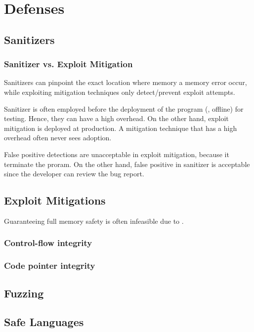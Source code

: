 \documentclass[11pt]{memoir}
\begin{document}
\chapter{Defenses}



\section{Sanitizers}
\subsection{Sanitizer vs. Exploit Mitigation}
Sanitizers can pinpoint the exact location where memory a memory error occur, while exploiting mitigation techniques only detect/prevent exploit attempts.

Sanitizer is often employed before the deployment of the program (\ie, offline) for testing.
Hence, they can have a high overhead.
On the other hand, exploit mitigation is deployed at production.  
A mitigation technique that has a high overhead often never sees adoption.

False positive detections are unacceptable in exploit mitigation, because it terminate the proram. 
On the other hand, false positive in sanitizer is acceptable since the developer can review the bug report.




\section{Exploit Mitigations}
Guaranteeing full memory safety is often infeasible due to .
\subsection{Control-flow integrity}

\subsection{Code pointer integrity}
\cite{szekeres2013sok}


\section{Fuzzing}

\section{Safe Languages}
\end{document}
